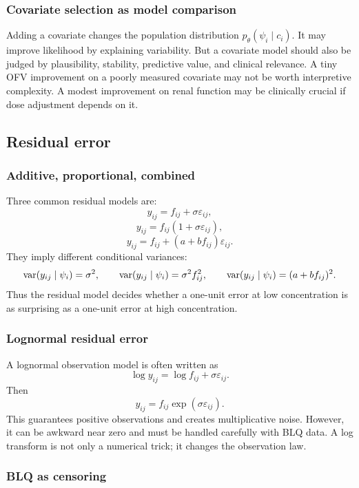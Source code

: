 \subsubsection*{Covariate selection as model comparison}

Adding a covariate changes the population distribution \(p_\theta(\psi_i\mid c_i)\).  It may improve likelihood by explaining variability.  But a covariate model should also be judged by plausibility, stability, predictive value, and clinical relevance.  A tiny OFV improvement on a poorly measured covariate may not be worth interpretive complexity.  A modest improvement on renal function may be clinically crucial if dose adjustment depends on it.

\subsection{Residual error}

\subsubsection*{Additive, proportional, combined}

Three common residual models are:
\[
  y_{ij}=f_{ij}+\sigma\varepsilon_{ij},
\]
\[
  y_{ij}=f_{ij}(1+\sigma\varepsilon_{ij}),
\]
\[
  y_{ij}=f_{ij}+(a+b f_{ij})\varepsilon_{ij}.
\]
They imply different conditional variances:
\[
  \operatorname{var}(y_{ij}\mid\psi_i)=\sigma^2,
  \qquad
  \operatorname{var}(y_{ij}\mid\psi_i)=\sigma^2 f_{ij}^2,
  \qquad
  \operatorname{var}(y_{ij}\mid\psi_i)=(a+b f_{ij})^2.
\]
Thus the residual model decides whether a one-unit error at low concentration is as surprising as a one-unit error at high concentration.

\subsubsection*{Lognormal residual error}

A lognormal observation model is often written as
\[
  \log y_{ij}=\log f_{ij}+\sigma\varepsilon_{ij}.
\]
Then
\[
  y_{ij}=f_{ij}\exp(\sigma\varepsilon_{ij}).
\]
This guarantees positive observations and creates multiplicative noise.  However, it can be awkward near zero and must be handled carefully with BLQ data.  A log transform is not only a numerical trick; it changes the observation law.

\subsubsection*{BLQ as censoring}

